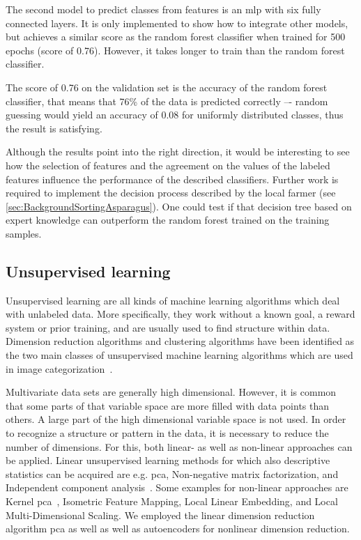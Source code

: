 The second model to predict classes from features is an \acrshort{mlp} with six fully connected layers. It is only implemented to show how to integrate other models, but achieves a similar score as the random forest classifier when trained for 500 epochs (score of 0.76). However, it takes longer to train than the random forest classifier.

The score of 0.76 on the validation set is the accuracy of the random forest classifier, that means that 76\% of the data is predicted correctly –- random guessing would yield an accuracy of 0.08 for uniformly distributed classes, thus the result is satisfying.

\bigskip
Although the results point into the right direction, it would be interesting to see how the selection of features and the agreement on the values of the labeled features influence the performance of the described classifiers. Further work is required to implement the decision process described by the local farmer (see \autoref{sec:BackgroundSortingAsparagus}). One could test if that decision tree based on expert knowledge can outperform the random forest trained on the training samples.


\subsection{Unsupervised learning}
\label{sec:UnsupervisedLearning}

Unsupervised learning are all kinds of machine learning algorithms which deal with unlabeled data. More specifically, they work without a known goal, a reward system or prior training, and are usually used to find structure within data. Dimension reduction algorithms and clustering algorithms have been identified as the two main classes of unsupervised machine learning algorithms which are used in image categorization~\citep{olaode2014}. 

\bigskip
Multivariate data sets are generally high dimensional. However, it is common that some parts of that variable space are more filled with data points than others. A large part of the high dimensional variable space is not used. In order to recognize a structure or pattern in the data, it is necessary to reduce the number of dimensions. For this, both linear- as well as non-linear approaches can be applied. Linear unsupervised learning methods for which also descriptive statistics can be acquired are e.g. \acrfull{pca}, Non-negative matrix factorization, and Independent component analysis~\citep{olaode2014}. Some examples for non-linear approaches are Kernel \acrshort{pca}~\citep{olivier2006semi}, Isometric Feature Mapping,  Local Linear Embedding, and Local Multi-Dimensional Scaling. We employed the linear dimension reduction algorithm \acrshort{pca} as well as well as autoencoders for nonlinear dimension reduction.


